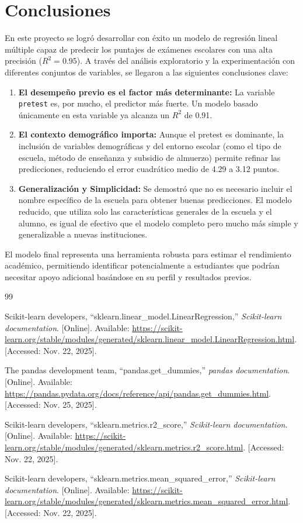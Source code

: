 \documentclass[12pt,letterpaper]{article}
\begin{document}
\section{Conclusiones}
En este proyecto se logró desarrollar con éxito un modelo de regresión lineal múltiple capaz de predecir los puntajes de exámenes escolares con una alta precisión ($R^2 = 0.95$). A través del análisis exploratorio y la experimentación con diferentes conjuntos de variables, se llegaron a las siguientes conclusiones clave:

\begin{enumerate}
    \item \textbf{El desempeño previo es el factor más determinante:} La variable \texttt{pretest} es, por mucho, el predictor más fuerte. Un modelo basado únicamente en esta variable ya alcanza un $R^2$ de 0.91.
    \item \textbf{El contexto demográfico importa:} Aunque el pretest es dominante, la inclusión de variables demográficas y del entorno escolar (como el tipo de escuela, método de enseñanza y subsidio de almuerzo) permite refinar las predicciones, reduciendo el error cuadrático medio de 4.29 a 3.12 puntos.
    \item \textbf{Generalización y Simplicidad:} Se demostró que no es necesario incluir el nombre específico de la escuela para obtener buenas predicciones. El modelo reducido, que utiliza solo las características generales de la escuela y el alumno, es igual de efectivo que el modelo completo pero mucho más simple y generalizable a nuevas instituciones.
\end{enumerate}

El modelo final representa una herramienta robusta para estimar el rendimiento académico, permitiendo identificar potencialmente a estudiantes que podrían necesitar apoyo adicional basándose en su perfil y resultados previos.

\begin{thebibliography}{99}

Scikit-learn developers, ``sklearn.linear\_model.LinearRegression,'' \textit{Scikit-learn documentation}. [Online]. Available: \url{https://scikit-learn.org/stable/modules/generated/sklearn.linear_model.LinearRegression.html}. [Accessed: Nov. 22, 2025].

The pandas development team, ``pandas.get\_dummies,'' \textit{pandas documentation}. [Online]. Available: \url{https://pandas.pydata.org/docs/reference/api/pandas.get_dummies.html}. [Accessed: Nov. 25, 2025].

Scikit-learn developers, ``sklearn.metrics.r2\_score,'' \textit{Scikit-learn documentation}. [Online]. Available: \url{https://scikit-learn.org/stable/modules/generated/sklearn.metrics.r2_score.html}. [Accessed: Nov. 22, 2025].

Scikit-learn developers, ``sklearn.metrics.mean\_squared\_error,'' \textit{Scikit-learn documentation}. [Online]. Available: \url{https://scikit-learn.org/stable/modules/generated/sklearn.metrics.mean_squared_error.html}. [Accessed: Nov. 22, 2025].

\end{thebibliography}
\end{document}
